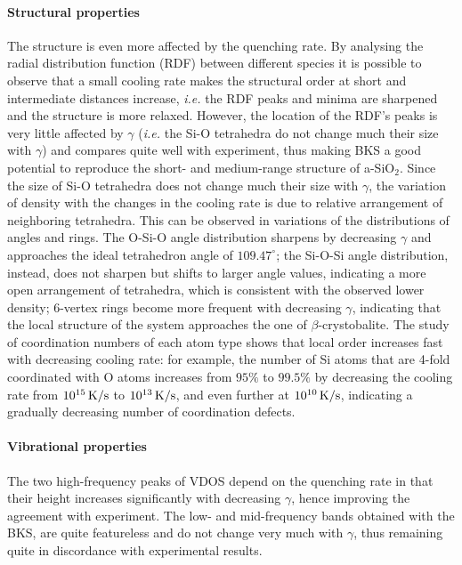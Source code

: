 \paragraph{Structural properties}
The structure is even more affected by the quenching rate. 
By analysing the radial distribution function (RDF) between different species it is possible to observe that a small cooling rate makes the structural order at short and intermediate distances increase, \emph{i.e.} the RDF peaks and minima are sharpened and the structure is more relaxed. However, the location of the RDF's peaks is very little affected by $\gamma$ (\emph{i.e.} the Si-O tetrahedra do not change much their size with $\gamma$) and compares quite well with experiment, thus making BKS a good potential to reproduce the short- and medium-range structure of a-SiO$_2$. 
Since the size of Si-O tetrahedra does not change much their size with $\gamma$, the variation of density with the changes in the cooling rate is due to relative arrangement of neighboring tetrahedra. 
This can be observed in variations of the distributions of angles and rings. The O-Si-O angle distribution sharpens by decreasing $\gamma$ and approaches the ideal tetrahedron angle of $109.47^\circ$; the Si-O-Si angle distribution, instead, does not sharpen but shifts to larger angle values, indicating a more open arrangement of tetrahedra, which is consistent with the observed lower density; $6$-vertex rings become more frequent with decreasing $\gamma$, indicating that the local structure of the system approaches the one of $\beta$-crystobalite. 
The study of coordination numbers of each atom type shows that local order increases fast with decreasing cooling rate: for example, the number of Si atoms that are 4-fold coordinated with O atoms increases from $95\%$ to $99.5\%$ by decreasing the cooling rate from $10^{15}\,\mathrm{K/s}$ to $10^{13}\,\mathrm{K/s}$, and even further at $10^{10}\,\mathrm{K/s}$, indicating a gradually decreasing number of coordination defects. 

\paragraph{Vibrational properties}
The two high-frequency peaks of VDOS depend on the quenching rate in that their height increases significantly with decreasing $\gamma$, hence improving the agreement with experiment. 
The low- and mid-frequency bands obtained with the BKS, are quite featureless and do not change very much with $\gamma$, thus remaining quite in discordance with experimental results. 

